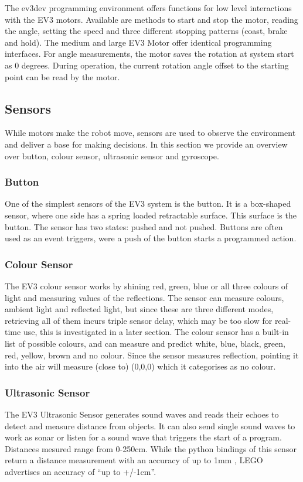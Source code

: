 \documentclass[11pt, a4paper]{article}
\begin{document}
The ev3dev programming environment offers functions for low level interactions with the EV3 motors. Available are methods to start and stop the motor, reading the angle, setting the speed and three different stopping patterns (coast, brake and hold). The medium and large EV3 Motor offer identical programming interfaces. For angle measurements, the motor saves the rotation at system start as 0 degrees. During operation, the current rotation angle offset to the starting point can be read by the motor. \cite{ev3_python}

\subsection{Sensors}
While motors make the robot move, sensors are used to observe the environment and deliver a base for making decisions. In this section we provide an overview over button, colour sensor, ultrasonic sensor and gyroscope.

\subsubsection*{Button}
One of the simplest sensors of the EV3 system is the button. It is a box-shaped sensor, where one side has a spring loaded retractable surface. This surface is the button. The sensor has two states: pushed and not pushed. Buttons are often used as an event triggers, were a push of the button starts a programmed action.




\subsubsection*{Colour Sensor}
The EV3 colour sensor works by shining red, green, blue or all three colours of light and measuring values of the reflections. The sensor can measure colours, ambient light and reflected light, but since these are three different modes, retrieving all of them incurs triple sensor delay, which may be too slow for real-time use, this is investigated in a later section. The colour sensor has a built-in list of possible colours, and can measure and predict white, blue, black, green, red, yellow, brown and no colour. Since the sensor measures reflection, pointing it into the air will measure (close to) (0,0,0) which it categorises as no colour.

\subsubsection*{Ultrasonic Sensor}
The EV3 Ultrasonic Sensor generates sound waves and reads their echoes to detect and measure distance from objects. It can also send single sound waves to work as sonar or listen for a sound wave that triggers the start of a program. Distances mesured range from 0-250cm. While the python bindings of this sensor return a distance measurement with an accuracy of up to 1mm \cite{ev3_python}, LEGO advertises an accuracy of  ``up to +/-1cm''. \cite{ultraosnic_sensor}
\end{document}
